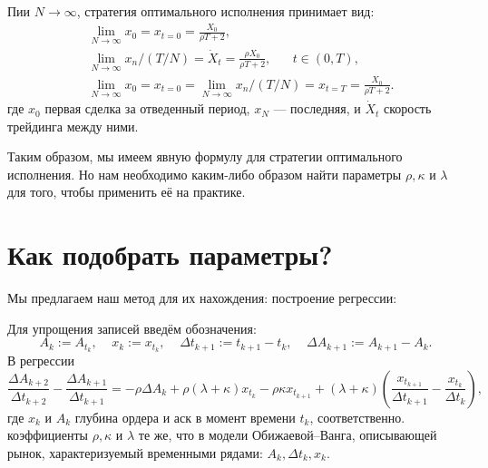 \begin{theorem}
    Пии $N \rightarrow \infty$, стратегия оптимального исполнения принимает вид:
    \begin{align*}
        & \lim _{N \rightarrow \infty} x_0 = x_{t = 0} = \frac{X_0}{\rho T + 2}, \\
        & \lim _{N \rightarrow \infty} x_n / (T/N) = \dot X _t = \frac{\rho X_0}{\rho T + 2}, \;\;\;\;\;\; t \in (0, T), \\
        & \lim _{N \rightarrow \infty} x_0 = x_{t = 0} = \lim _{N \rightarrow \infty} x_n / (T/N) = x_{t=T}=  \frac{X_0}{\rho T + 2}.  %
    \end{align*}
    где $x_0$ первая сделка за отведенный период, $x_N$ --- последняя, и $\dot X _t$ скорость трейдинга между ними.
\end{theorem}

Таким образом, мы имеем явную формулу для стратегии оптимального исполнения. Но нам необходимо каким-либо образом найти
параметры $\rho, \kappa$ и $\lambda$ для того, чтобы применить её на практике. 

\section{Как подобрать параметры?}

Мы предлагаем наш метод для их нахождения: построение регрессии: 
\begin{theorem}
    Для упрощения записей введём обозначения:
    \[
    A_k := A_{t_k}, \; \; \; \; 
    x_{k}:= x_{t_k}, \; \; \; \; 
    \Delta t_{k+1} := t_{k+1} - t_k, \; \; \; \;   
    \Delta A_{k+1} := A_{k+1} - A_k. 
    \]
        В регрессии                                                                                                                                                                                                                                                                                                                                                                                       
        \begin{equation*}
            \frac{\Delta A_{k+2}}{\Delta t_{k+2}} - \frac{\Delta A_{k+1}}{\Delta t_{k+1}} 
        = -\rho \Delta A_k + \rho (\lambda + \kappa) x_{t_k} - \rho \kappa x_{t_{k+1}} 
        + (\lambda + \kappa) \left(\frac{x_{t_{k+1}}}{\Delta t_{k+1}} - \frac{x_{t_k}}{\Delta t_{k}}\right),
        \end{equation*}
        где $x_{k}$ и $A_{k}$ глубина ордера и аск в момент времени $t_k$, соответственно. \\

        коэффициенты $\rho, \kappa$ и $\lambda$ те же, что в модели Обижаевой--Ванга, описывающей рынок,
        характеризуемый временными рядами: $A_k, \Delta t _k, x_k$.



\end{theorem}

